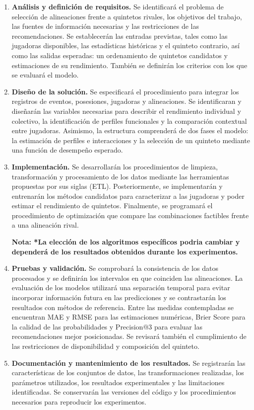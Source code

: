 \begin{enumerate}[label=\arabic*.]
    \item \textbf{Análisis y definición de requisitos.}
    Se identificará el problema de selección de alineaciones frente a quintetos rivales, los objetivos del trabajo, las fuentes de información necesarias y las restricciones de las recomendaciones. Se establecerán las entradas previstas, tales como las jugadoras disponibles, las estadísticas históricas y el quinteto contrario, así como las salidas esperadas: un ordenamiento de quintetos candidatos y estimaciones de su rendimiento. También se definirán los criterios con los que se evaluará el modelo.

    \item \textbf{Diseño de la solución.}
    Se especificará el procedimiento para integrar los registros de eventos, posesiones, jugadoras y alineaciones. Se identificaran y  diseñarán las variables necesarias para describir el rendimiento individual y colectivo, la identificación de perfiles funcionales y la comparación contextual entre jugadoras. Asimismo,  la estructura comprenderá de dos fases el modelo: la estimación de perfiles e interacciones y la selección de un quinteto mediante una función de desempeño esperado.

    \item \textbf{Implementación.}
    Se desarrollarán los procedimientos de limpieza, transformación y procesamiento de los datos mediante las herramientas propuestas por sus siglas (ETL). Posteriormente, se implementarán y entrenarán los métodos candidatos para caracterizar a las jugadoras y poder estimar el rendimiento de quintetos. Finalmente, se programará el procedimiento de optimización que compare las combinaciones factibles frente a una alineación rival.
    \begin{center}
\textbf{    Nota: *La elección de los algoritmos específicos podria cambiar y dependerá de los resultados obtenidos durante los experimentos.}
    \end{center}

    \item \textbf{Pruebas y validación.}
    Se comprobará la consistencia de los datos procesados y se definirán los intervalos en que coinciden las alineaciones. La evaluación de los modelos utilizará una separación temporal para evitar incorporar información futura en las predicciones y se contrastarán los resultados con métodos de referencia. Entre las medidas contempladas se encuentran MAE y RMSE para las estimaciones numéricas, Brier Score para la calidad de las probabilidades y Precision@3 para evaluar las recomendaciones mejor posicionadas. Se revisará también el cumplimiento de las restricciones de disponibilidad y composición del quinteto.

    \item \textbf{Documentación y mantenimiento de los resultados.}
    Se registrarán las características de los conjuntos de datos, las transformaciones realizadas, los parámetros utilizados, los resultados experimentales y las limitaciones identificadas. Se conservarán las versiones del código y los procedimientos necesarios para reproducir los experimentos.
\end{enumerate}

